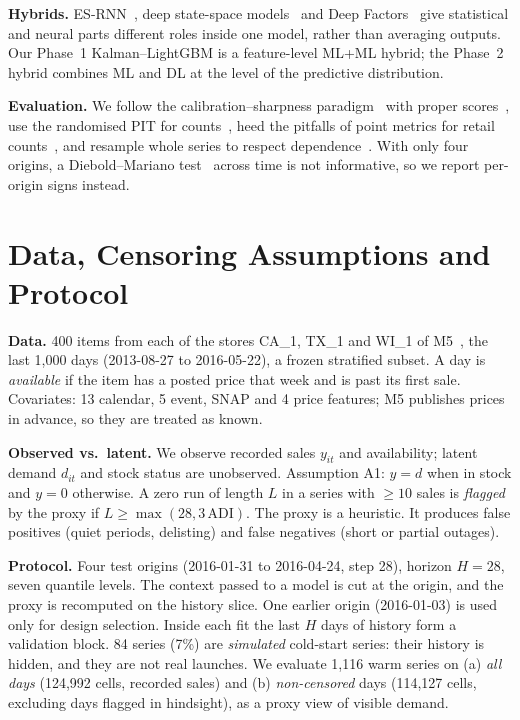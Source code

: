 \documentclass[conference]{IEEEtran}
\begin{document}
\textbf{Hybrids.} ES-RNN~\cite{smyl2020}, deep state-space models~\cite{rangapuram2018} and Deep Factors~\cite{wang2019deepfactors} give statistical and neural parts different roles inside one model, rather than averaging outputs. Our Phase~1 Kalman--LightGBM is a feature-level ML+ML hybrid; the Phase~2 hybrid combines ML and DL at the level of the predictive distribution.

\textbf{Evaluation.} We follow the calibration--sharpness paradigm~\cite{gneiting2007calibration} with proper scores~\cite{gneiting2007}, use the randomised PIT for counts~\cite{czado2009}, heed the pitfalls of point metrics for retail counts~\cite{kolassa2016}, and resample whole series to respect dependence~\cite{kunsch1989}. With only four origins, a Diebold--Mariano test~\cite{diebold1995} across time is not informative, so we report per-origin signs instead.

\section{Data, Censoring Assumptions and Protocol}\label{sec:data}
\textbf{Data.} 400 items from each of the stores CA\_1, TX\_1 and WI\_1 of M5~\cite{makridakis2022accuracy}, the last 1,000 days (2013-08-27 to 2016-05-22), a frozen stratified subset. A day is \emph{available} if the item has a posted price that week and is past its first sale. Covariates: 13 calendar, 5 event, SNAP and 4 price features; M5 publishes prices in advance, so they are treated as known.

\textbf{Observed vs.\ latent.} We observe recorded sales $y_{it}$ and availability; latent demand $d_{it}$ and stock status are unobserved. Assumption A1: $y=d$ when in stock and $y=0$ otherwise. A zero run of length $L$ in a series with $\geq10$ sales is \emph{flagged} by the proxy if $L\ge\max(28,3\,\mathrm{ADI})$. The proxy is a heuristic. It produces false positives (quiet periods, delisting) and false negatives (short or partial outages).

\textbf{Protocol.} Four test origins (2016-01-31 to 2016-04-24, step 28), horizon $H=28$, seven quantile levels. The context passed to a model is cut at the origin, and the proxy is recomputed on the history slice. One earlier origin (2016-01-03) is used only for design selection. Inside each fit the last $H$ days of history form a validation block. 84 series (7\%) are \emph{simulated} cold-start series: their history is hidden, and they are not real launches. We evaluate 1,116 warm series on (a) \emph{all days} (124,992 cells, recorded sales) and (b) \emph{non-censored} days (114,127 cells, excluding days flagged in hindsight), as a proxy view of visible demand.
\end{document}
